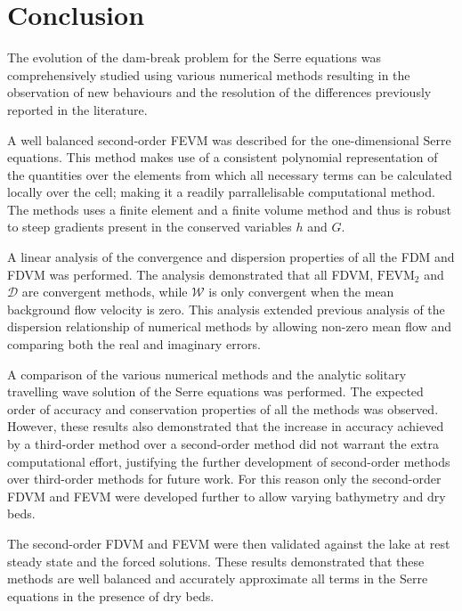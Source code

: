 
\chapter{Conclusion}
\label{chp:Conclusion}



The evolution of the dam-break problem for the Serre equations was comprehensively studied using various numerical methods resulting in the observation of new behaviours and the resolution of the differences previously reported in the literature.  

A well balanced second-order FEVM was described for the one-dimensional Serre equations. This method makes use of a consistent polynomial representation of the quantities over the elements from which all necessary terms can be calculated locally over the cell; making it a readily parrallelisable computational method. The methods uses a finite element and a finite volume method and thus is robust to steep gradients present in the conserved variables $h$ and $G$. 

A linear analysis of the convergence and dispersion properties of all the FDM and FDVM \cite{Pitt-2018-61} was performed. The analysis demonstrated that all FDVM, $\text{FEVM}_2$ and $\mathcal{D}$ are convergent methods, while $\mathcal{W}$ is only convergent when the mean background flow velocity is zero. This analysis extended previous analysis of the dispersion relationship of numerical methods by allowing non-zero mean flow and comparing both the real and imaginary errors. 

A comparison of the various numerical methods and the analytic solitary travelling wave solution of the Serre equations was performed. The expected order of accuracy and conservation properties of all the methods was observed. However, these results also demonstrated that the increase in accuracy achieved by a third-order method over a second-order method did not warrant the extra computational effort, justifying the further development of second-order methods over third-order methods for future work. For this reason only the second-order FDVM and FEVM were developed further to allow varying bathymetry and dry beds.

The second-order FDVM and FEVM were then validated against the lake at rest steady state and the forced solutions. These results demonstrated that these methods are well balanced and accurately approximate all terms in the Serre equations in the presence of dry beds. 

